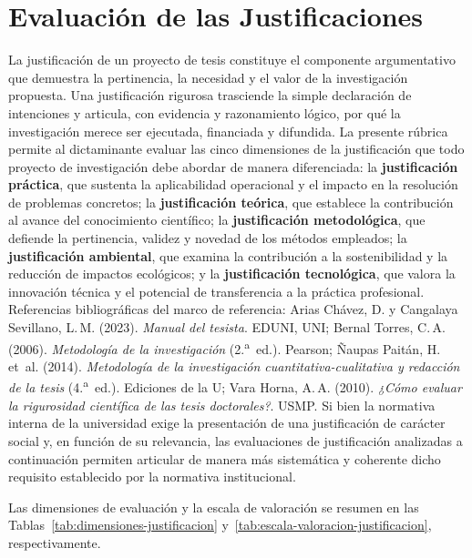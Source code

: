 \clearpage
\section{Evaluación de las Justificaciones}

{\footnotesize
La justificación de un proyecto de tesis constituye el componente argumentativo que demuestra la pertinencia, la necesidad y el valor de la investigación propuesta. Una justificación rigurosa trasciende la simple declaración de intenciones y articula, con evidencia y razonamiento lógico, por qué la investigación merece ser ejecutada, financiada y difundida. La presente rúbrica permite al dictaminante evaluar las cinco dimensiones de la justificación que todo proyecto de investigación debe abordar de manera diferenciada: la \textbf{justificación práctica}, que sustenta la aplicabilidad operacional y el impacto en la resolución de problemas concretos; la \textbf{justificación teórica}, que establece la contribución al avance del conocimiento científico; la \textbf{justificación metodológica}, que defiende la pertinencia, validez y novedad de los métodos empleados; la \textbf{justificación ambiental}, que examina la contribución a la sostenibilidad y la reducción de impactos ecológicos; y la \textbf{justificación tecnológica}, que valora la innovación técnica y el potencial de transferencia a la práctica profesional. Referencias bibliográficas del marco de referencia: Arias Chávez, D. y Cangalaya Sevillano, L.\,M. (2023). \textit{Manual del tesista}. EDUNI, UNI; Bernal Torres, C.\,A. (2006). \textit{Metodología de la investigación} (2.\textsuperscript{a}~ed.). Pearson; Ñaupas Paitán, H. et~al. (2014). \textit{Metodología de la investigación cuantitativa-cualitativa y redacción de la tesis} (4.\textsuperscript{a}~ed.). Ediciones de la U; Vara Horna, A.\,A. (2010). \textit{¿Cómo evaluar la rigurosidad científica de las tesis doctorales?}. USMP. Si bien la normativa interna de la universidad exige la presentación de una justificación de carácter social y, en función de su relevancia, las evaluaciones de justificación analizadas a continuación permiten articular de manera más sistemática y coherente dicho requisito establecido por la normativa institucional.
\par}


Las dimensiones de evaluación y la escala de valoración se resumen en las Tablas~\ref{tab:dimensiones-justificacion} y~\ref{tab:escala-valoracion-justificacion}, respectivamente.

